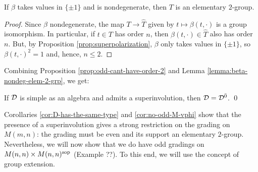 \begin{lemma}\label{lemma:beta-nondeg-elem-2-grp}
    If $\beta$ takes values in $\{ \pm 1 \}$ and is nondegenerate, then $T$ is an elementary $2$-group.
\end{lemma}

\begin{proof}
    Since $\beta$ nondegenerate, the map $T \to \widehat T$ given by $t \mapsto \beta(t, \cdot)$ is a group isomorphism.
    In particular, if $t\in T$ has order $n$, then $\beta(t, \cdot)\in \widehat T$ also has order $n$.
    But, by Proposition \ref{prop:superpolarization}, $\beta$ only takes values in $\{ \pm 1\}$, so  $\beta(t, \cdot )^2 =1$ and, hence, $ n \leq 2$.
\end{proof}

Combining Proposition \ref{prop:odd-cant-have-order-2} and Lemma \ref{lemma:beta-nondeg-elem-2-grp}, we get:

\begin{cor}\label{cor:no-odd-M-vphi}
    If $\mathcal{D}$ is simple as an algebra and admits a superinvolution, then $\mathcal{D} = \mathcal{D}^{\bar0}$. \qed
\end{cor}


Corollaries \ref{cor:D-has-the-same-type} and \ref{cor:no-odd-M-vphi} show that the presence of a superinvolution gives a strong restriction on the grading on $M(m,n)$: the grading must be even and its support an elementary $2$-group. 
Nevertheless, we will now show that we do have odd gradings on $M(n,n)\times M(n,n)^{\mathrm{sop}}$ (Example ??). 
To this end, we will use the concept of group extension.

